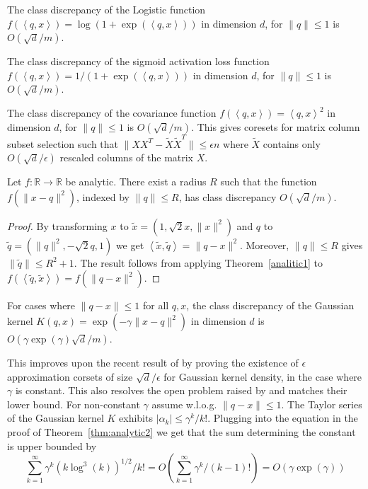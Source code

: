 \documentclass[anon,12pt]{colt2019} %
\newcommand{\ip}[1]{\left \langle #1 \right \rangle}
\newcommand{\R}{\mathbb{R}}
\newcommand{\eps}{\epsilon}
\begin{document}
{\begin{corollary}\label{cdlogistic}
The class discrepancy of the Logistic function $f(\ip{q,x}) = \log(1+\exp(\ip{q,x}))$ in dimension $d$, for $\|q\| \leq 1$ is $O(\sqrt{d}/m)$.
\end{corollary}
\begin{corollary}\label{cdsigmoid}
The class discrepancy of the sigmoid activation loss function $f(\ip{q,x}) = 1/(1+\exp(\ip{q,x}))$ in dimension $d$, for $\|q\| \leq 1$ is $O(\sqrt{d}/m)$.
\end{corollary}


\begin{corollary}
The class discrepancy of the covariance function $f(\ip{q,x}) = \ip{q,x}^2$ in dimension $d$, for $\|q\| \leq 1$ is $O(\sqrt{d}/m)$. This gives coresets for matrix column subset selection such that $\|XX^T - \tilde X \tilde X^T\| \le \eps n$ where $\tilde X$ contains only $O(\sqrt{d}/\eps)$ rescaled columns of the matrix $X$.
\end{corollary}



\begin{theorem} \label{thm:analytic2}
Let $f:\R\rightarrow\R$ be analytic. There exist a radius $R$ such that the function $f(\|x-q\|^2)$, indexed by $\|q\| \leq R$, has class discrepancy $O(\sqrt{d}/m)$. 
\end{theorem}
\begin{proof}
By transforming $x$ to $\tilde{x} = (1, \sqrt{2}x, \|x\|^2)$ and $q$ to $\tilde{q} = (\|q\|^2, -\sqrt{2}q, 1)$ we get $\ip{\tilde{x},\tilde{q}} = \|q-x\|^2$. Moreover, $\|q\| \le R$ gives $\|\tilde q\| \le R^2+1$. The result follows from applying Theorem~\ref{analitic1} to $f(\ip{ \tilde q, \tilde x}) = f(\|q-x\|^2)$.
\end{proof}

\begin{corollary}
For cases where $\|q-x\| \leq 1$ for all $q,x$, the class discrepancy of the Gaussian kernel $K(q,x) = \exp(-\gamma \|x-q\|^2)$ in dimension $d$ is $O(\gamma\exp(\gamma)\sqrt{d}/m)$.
\end{corollary} 
This improves upon the recent result of \cite{DBLP:journals/corr/abs-1802-01751} by proving the existence of $\eps$ approximation corsets of size $\sqrt{d}/\eps$ for Gaussian kernel density, in the case where $\gamma$ is constant. 
This also resolves the open problem raised by \cite{DBLP:journals/corr/abs-1802-01751} and matches their lower bound.   
For non-constant $\gamma$ assume w.l.o.g. $\|q-x\| \le 1$. The Taylor series of the Gaussian kernel $K$ exhibits $|\alpha_k| \le \gamma^k/k!$.
Plugging into the equation in the proof of Theorem~\ref{thm:analytic2} we get that the sum determining the constant is upper bounded by
$$\sum_{k=1}^\infty \gamma^{k}(k\log^3(k))^{1/2}/k! = O\left(\sum_{k=1}^\infty \gamma^{k}/(k-1)!\right) = O\left(\gamma \exp(\gamma)\right)$$

}
\end{document}
